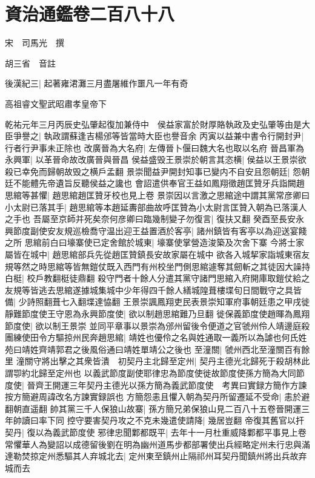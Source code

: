 \section{資治通鑑卷二百八十八}
宋　司馬光　撰

胡三省　音註

後漢紀三|{
	起著雍涒灘三月盡屠維作噩凡一年有奇}


高祖睿文聖武昭肅孝皇帝下

乾祐元年三月丙辰史弘肇起復加兼侍中　侯益家富於財厚賂執政及史弘肇等由是大臣爭譽之|{
	執政謂蘇逢吉楊邠等皆當時大臣也譽音余}
丙寅以益兼中書令行開封尹|{
	行者行尹事未正除也}
改廣晉為大名府|{
	左傳晉卜偃曰魏大名也取以名府}
晉昌軍為永興軍|{
	以革晉命故改廣晉與晉昌}
侯益盛毁王景崇於朝言其恣横|{
	侯益以王景崇欲殺已幸免而歸朝故毁之横戶孟翻}
景崇聞益尹開封知事已變内不自安且怨朝廷|{
	怨朝廷不能體先帝遺旨反聽侯益之讒也}
會詔遣供奉官王益如鳳翔徵趙匡贊牙兵詣闕趙思綰等甚懼|{
	趙思綰趙匡贊牙校也見上卷}
景崇因以言激之思綰途中謂其黨常彦卿曰小太尉已落其手|{
	趙思綰等本趙延夀部曲故呼匡贊為小太尉言匡贊入朝為已落漢人之手也}
吾屬至京師并死矣奈何彦卿曰臨幾制變子勿復言|{
	復扶又翻}
癸酉至長安永興節度副使安友規巡檢喬守温出迎王益置酒於客亭|{
	諸州鎮皆有客亭以為迎送宴餞之所}
思綰前白曰壕寨使已定舍館於城東|{
	壕寨使掌營造浚築及次舍下寨}
今將士家屬皆在城中|{
	趙思綰部兵先從趙匡贊鎮長安故家屬在城中}
欲各入城挈家詣城東宿友規等然之時思綰等皆無鎧仗既入西門有州校坐門側思綰遽奪其劒斬之其徒因大譟持白梃|{
	校戶教翻梃徒鼎翻}
殺守門者十餘人分遣其黨守諸門思綰入府開庫取鎧仗給之友規等皆逃去思綰遂據城集城中少年得四千餘人繕城隍葺樓堞旬日間戰守之具皆備|{
	少詩照翻葺七入翻堞達恊翻}
王景崇諷鳳翔吏民表景崇知軍府事朝廷患之甲戌徙靜難節度使王守恩為永興節度使|{
	欲以制趙思綰難乃旦翻}
徙保義節度使趙暉為鳳翔節度使|{
	欲以制王景崇}
並同平章事以景崇為邠州留後令便道之官虢州伶人靖邊庭殺團練使田令方驅掠州民奔趙思綰|{
	靖姓也優伶之名與姓通取一義所以為謔也何氏姓苑曰靖姓齊靖郭君之後風俗通曰靖姓單靖公之後也}
至潼關|{
	虢州西北至潼關百有餘里}
潼關守將出擊之其衆皆潰　初契丹主北歸至定州|{
	契丹主德光北歸死于殺胡林此謂卾約北歸至定州也}
以義武節度副使耶律忠為節度使徙故節度使孫方簡為大同節度使|{
	晉齊王開運三年契丹主德光以孫方簡為義武節度使　考異曰實録方簡作方諫按方簡避周諱改名方諫實録誤也}
方簡怨恚且懼入朝為契丹所留遷延不受命|{
	恚於避翻朝直遥翻}
帥其黨三千人保狼山故寨|{
	孫方簡兄弟保狼山見二百八十五卷晉開運三年帥讀曰率下同}
控守要害契丹攻之不克未幾遣使請降|{
	幾居豈翻}
帝復其舊官以扞契丹|{
	復以為義武節度使}
邪律忠聞鄴都既平|{
	去年十一月杜重威降鄴都平事見上卷}
常懼華人為變詔以成德留後劉在明為幽州道馬步都部署使出兵經略定州未行忠與滿達勒焚掠定州悉驅其人弃城北去|{
	定州東至鎮州止隔祁州耳契丹聞鎮州將出兵故弃城而去}
